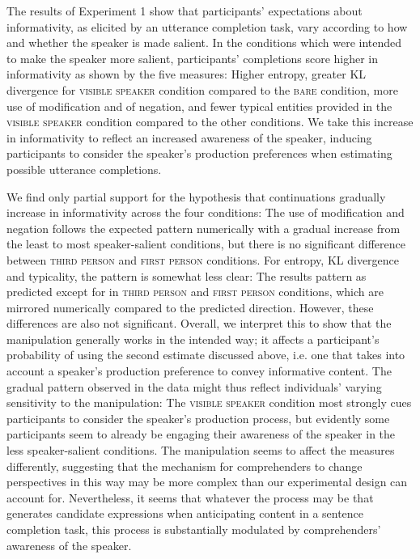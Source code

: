 \documentclass[output=paper,colorlinks,citecolor=brown]{langscibook}
\begin{document}
The results of Experiment 1 show that participants' expectations about informativity, as elicited by an utterance completion task, vary according to how and whether the speaker is made salient. In the conditions which were intended to make the speaker more salient, participants’ completions score higher in informativity as shown by the five measures: Higher entropy, greater KL divergence for \textsc{visible speaker} condition compared to the \textsc{bare} condition, more use of modification and of negation, and fewer typical entities provided in the \textsc{visible speaker} condition compared to the other conditions. We take this increase in informativity to reflect an increased awareness of the speaker, inducing participants to consider the speaker's production preferences when estimating possible utterance completions. 

We find only partial support for the hypothesis that continuations gradually increase in informativity across the four conditions: The use of modification and negation follows the expected pattern numerically with a gradual increase from the least to most speaker-salient conditions, but there is no significant difference between \textsc{third person} and \textsc{first person} conditions. For entropy, KL divergence and typicality, the pattern is somewhat less clear: The results pattern as predicted except for in \textsc{third person} and \textsc{first person} conditions, which are mirrored numerically compared to the predicted direction. However, these differences are also not significant. Overall, we interpret this to show that the manipulation generally works in the intended way; it affects a participant's probability of using the second estimate discussed above, i.e. one that takes into account a speaker's production preference to convey informative content. The gradual pattern observed in the data might thus reflect individuals' varying sensitivity to the manipulation: The \textsc{visible speaker} condition most strongly cues participants to consider the speaker's production process, but evidently some participants seem to already be engaging their awareness of the speaker in the less speaker-salient conditions. The manipulation seems to affect the measures differently, suggesting that the mechanism for comprehenders to change perspectives in this way may be more complex than our experimental design can account for. Nevertheless, it seems that whatever the process may be that generates candidate expressions when anticipating content in a sentence completion task, this process is substantially modulated by comprehenders' awareness of the speaker.
\end{document}
